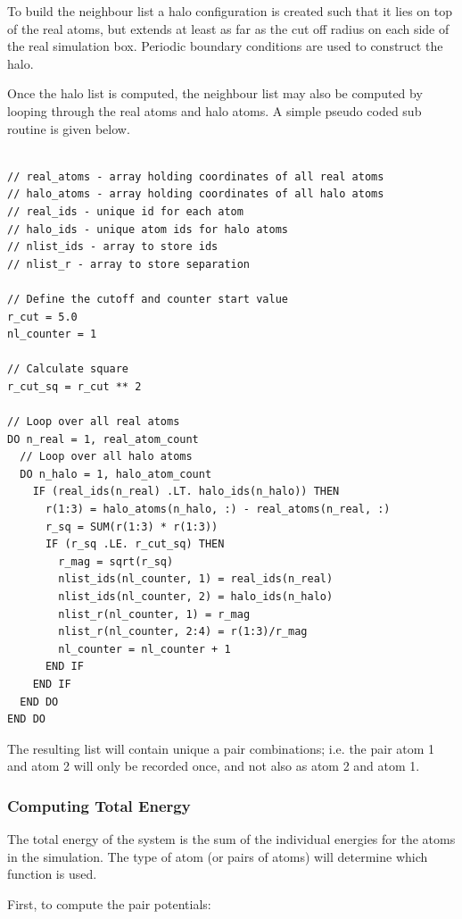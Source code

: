 To build the neighbour list a halo configuration is created such that it lies on top of the real atoms, but extends at least as far as the cut off radius on each side of the real simulation box.  Periodic boundary conditions are used to construct the halo.

Once the halo list is computed, the neighbour list may also be computed by looping through the real atoms and halo atoms.  A simple pseudo coded sub routine is given below.


\begin{lstlisting}[style=sPseudo,caption={Simple genetic optimisation subroutine}]

// real_atoms - array holding coordinates of all real atoms
// halo_atoms - array holding coordinates of all halo atoms
// real_ids - unique id for each atom
// halo_ids - unique atom ids for halo atoms
// nlist_ids - array to store ids
// nlist_r - array to store separation

// Define the cutoff and counter start value
r_cut = 5.0
nl_counter = 1

// Calculate square
r_cut_sq = r_cut ** 2

// Loop over all real atoms
DO n_real = 1, real_atom_count
  // Loop over all halo atoms
  DO n_halo = 1, halo_atom_count
    IF (real_ids(n_real) .LT. halo_ids(n_halo)) THEN
      r(1:3) = halo_atoms(n_halo, :) - real_atoms(n_real, :)
      r_sq = SUM(r(1:3) * r(1:3))
      IF (r_sq .LE. r_cut_sq) THEN          
        r_mag = sqrt(r_sq)          
        nlist_ids(nl_counter, 1) = real_ids(n_real)
        nlist_ids(nl_counter, 2) = halo_ids(n_halo)        
        nlist_r(nl_counter, 1) = r_mag
        nlist_r(nl_counter, 2:4) = r(1:3)/r_mag
        nl_counter = nl_counter + 1
      END IF
    END IF
  END DO
END DO 
\end{lstlisting}

The resulting list will contain unique a pair combinations; i.e. the pair atom 1 and atom 2 will only be recorded once, and not also as atom 2 and atom 1.


\subsubsection{Computing Total Energy}

The total energy of the system is the sum of the individual energies for the atoms in the simulation.  The type of atom (or pairs of atoms) will determine which function is used.

First, to compute the pair potentials:

